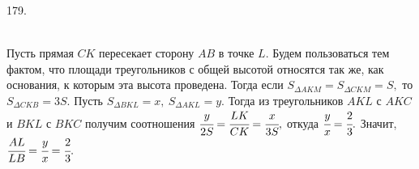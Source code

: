 179. \begin{figure}[ht!]
\end{figure}\\
Пусть прямая $CK$ пересекает сторону $AB$ в точке $L.$ Будем пользоваться тем фактом, что площади треугольников с общей высотой относятся так же, как основания, к которым эта высота проведена. Тогда если $S_{\Delta AKM}=S_{\Delta CKM}=S,$ то $S_{\Delta CKB}=3S.$ Пусть $S_{\Delta BKL}=x,\ S_{\Delta AKL}=y.$ Тогда из треугольников $AKL$ с $AKC$ и $BKL$ с $BKC$ получим соотношения $\cfrac{y}{2S}=\cfrac{LK}{CK}=\cfrac{x}{3S},$ откуда $\cfrac{y}{x}=\cfrac{2}{3}.$ Значит, $\cfrac{AL}{LB}=\cfrac{y}{x}=\cfrac{2}{3}.$\\
